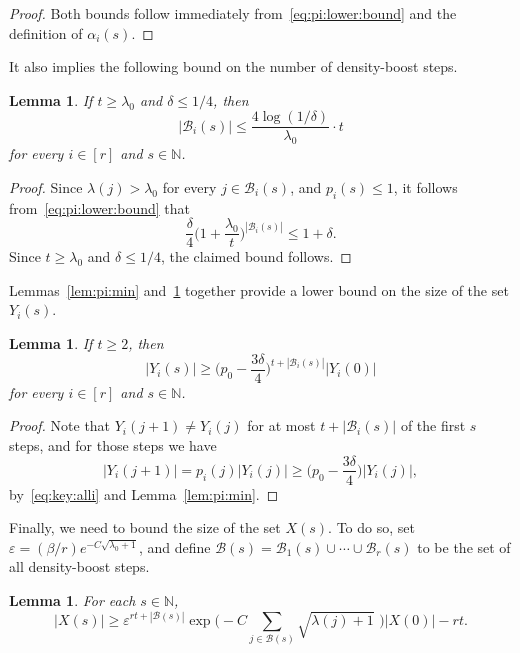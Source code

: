 \documentclass[12pt,reqno]{amsart}
\newtheorem{lemma}[theorem]{Lemma}
\theoremstyle{definition}
\theoremstyle{remark}
\newcommand\N{\mathbb{N}}
\newcommand\cB{\mathcal{B}}
\newcommand\eps{\varepsilon}
\renewcommand{\le}{\leqslant}
\renewcommand{\ge}{\geqslant}
\def\eps{\varepsilon}
\def\N{\mathbb{N}}
\def\cB{\mathcal{B}}
\begin{document}
\begin{proof}
Both bounds follow immediately from~\eqref{eq:pi:lower:bound} and the definition of $\alpha_i(s)$. 
\end{proof}

It also implies the following bound on the number of density-boost steps. 

\begin{lemma}\label{lem:Bi:max}
If\/ $t \ge \lambda_0$ and\/ $\delta \le 1/4$, then
$$|\cB_i(s)| \le \frac{4 \log(1/\delta)}{\lambda_0} \cdot t$$
for every $i \in [r]$ and $s \in \N$. 
\end{lemma}

\begin{proof}
Since $\lambda(j) > \lambda_0$ for every $j \in \cB_i(s)$, and $p_i(s) \le 1$, it follows from~\eqref{eq:pi:lower:bound} that
$$\frac{\delta}{4} \bigg( 1 + \frac{\lambda_0}{t} \bigg)^{|\cB_i(s)|} \le 1 + \delta.$$
Since $t \ge \lambda_0$ and $\delta \le 1/4$, the claimed bound follows. 
\end{proof}

Lemmas~\ref{lem:pi:min} and~\ref{lem:Bi:max} together provide a lower bound on the size of the set $Y_i(s)$. 

\begin{lemma}\label{lem:Y:lower:bound}
If\/ $t \ge 2$, then
$$|Y_i(s)| \ge \bigg( p_0 - \frac{3\delta}{4} \bigg)^{t + |\cB_i(s)|} |Y_i(0)|$$
for every $i \in [r]$ and $s \in \N$. 
\end{lemma}

\begin{proof}
Note that $Y_i(j+1) \ne Y_i(j)$ for at most $t + |\cB_i(s)|$ of the first $s$ steps, and for those steps we have
$$|Y_i(j+1)| = p_i(j) |Y_i(j)| \ge \bigg( p_0 - \frac{3\delta}{4} \bigg) |Y_i(j)|,$$ 
by~\eqref{eq:key:alli} and Lemma~\ref{lem:pi:min}.
\end{proof}

Finally, we need to bound the size of the set $X(s)$. To do so, set $\eps = (\beta / r) e^{- C \sqrt{\lambda_0 + 1}}$, and define $\cB(s) = \cB_1(s) \cup \cdots \cup \cB_r(s)$ to be the set of all density-boost steps. 

\begin{lemma}\label{lem:X:lower:bound}
For each $s \in \N$, 
\begin{equation}\label{eq:X:lower:bound}
|X(s)| \ge \eps^{rt + |\cB(s)|} \exp\bigg( - C \sum_{j \in \cB(s)} \sqrt{\lambda(j)+1}\,\, \bigg) |X(0)| - rt.
\end{equation}
\end{lemma}
\end{document}

